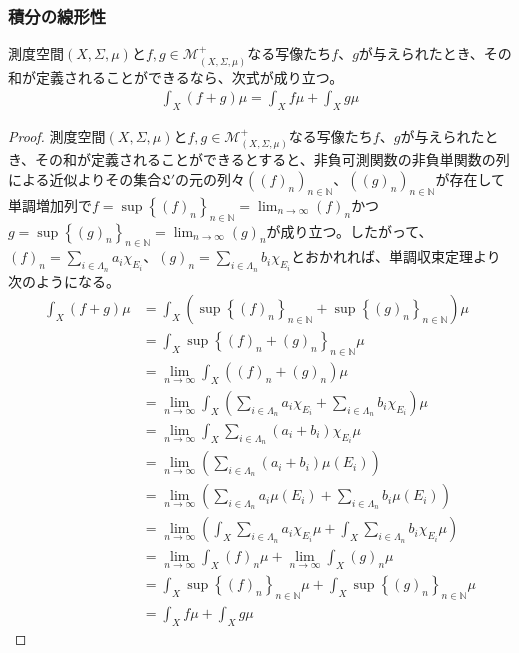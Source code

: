 \documentclass[dvipdfmx]{jsarticle}
\begin{document}
\subsubsection{積分の線形性}%
\begin{thm}\label{4.6.1.29}
測度空間$(X,\varSigma,\mu)$と$f,g \in \mathcal{M}_{(X,\varSigma,\mu)}^{+}$なる写像たち$f$、$g$が与えられたとき、その和が定義されることができるなら、次式が成り立つ。
\begin{align*}
\int_{X} {(f + g)\mu} = \int_{X} {f\mu} + \int_{X} {g\mu}
\end{align*}
\end{thm}
\begin{proof}
測度空間$(X,\varSigma,\mu)$と$f,g \in \mathcal{M}_{(X,\varSigma,\mu)}^{+}$なる写像たち$f$、$g$が与えられたとき、その和が定義されることができるとすると、非負可測関数の非負単関数の列による近似よりその集合$\mathfrak{L}'$の元の列々$\left( (f)_{n} \right)_{n \in \mathbb{N}}$、$\left( (g)_{n} \right)_{n \in \mathbb{N}}$が存在して単調増加列で$f = \sup\left\{ (f)_{n} \right\}_{n \in \mathbb{N}} = \lim_{n \rightarrow \infty}(f)_{n}$かつ$g = \sup\left\{ (g)_{n} \right\}_{n \in \mathbb{N}} = \lim_{n \rightarrow \infty}(g)_{n}$が成り立つ。したがって、$(f)_{n} = \sum_{i \in \varLambda_{n}} {a_{i}\chi_{E_{i}}}$、$(g)_{n} = \sum_{i \in \varLambda_{n}} {b_{i}\chi_{E_{i}}}$とおかれれば、単調収束定理より次のようになる。
\begin{align*}
\int_{X} {(f + g)\mu} &= \int_{X} {\left( \sup\left\{ (f)_{n} \right\}_{n \in \mathbb{N}} + \sup\left\{ (g)_{n} \right\}_{n \in \mathbb{N}} \right)\mu}\\
&= \int_{X} {\sup\left\{ (f)_{n} + (g)_{n} \right\}_{n \in \mathbb{N}}\mu}\\
&= \lim_{n \rightarrow \infty}{\int_{X} {\left( (f)_{n} + (g)_{n} \right)\mu}}\\
&= \lim_{n \rightarrow \infty}{\int_{X} {\left( \sum_{i \in \varLambda_{n}} {a_{i}\chi_{E_{i}}} + \sum_{i \in \varLambda_{n}} {b_{i}\chi_{E_{i}}} \right)\mu}}\\
&= \lim_{n \rightarrow \infty}{\int_{X} {\sum_{i \in \varLambda_{n}} {\left( a_{i} + b_{i} \right)\chi_{E_{i}}}\mu}}\\
&= \lim_{n \rightarrow \infty}\left( \sum_{i \in \varLambda_{n}} {\left( a_{i} + b_{i} \right)\mu\left( E_{i} \right)} \right)\\
&= \lim_{n \rightarrow \infty}\left( \sum_{i \in \varLambda_{n}} {a_{i}\mu\left( E_{i} \right)} + \sum_{i \in \varLambda_{n}} {b_{i}\mu\left( E_{i} \right)} \right)\\
&= \lim_{n \rightarrow \infty}\left( \int_{X} {\sum_{i \in \varLambda_{n}} {a_{i}\chi_{E_{i}}}\mu} + \int_{X} {\sum_{i \in \varLambda_{n}} {b_{i}\chi_{E_{i}}}\mu} \right)\\
&= \lim_{n \rightarrow \infty}{\int_{X} {(f)_{n}\mu}} + \lim_{n \rightarrow \infty}{\int_{X} {(g)_{n}\mu}}\\
&= \int_{X} {\sup\left\{ (f)_{n} \right\}_{n \in \mathbb{N}}\mu} + \int_{X} {\sup\left\{ (g)_{n} \right\}_{n \in \mathbb{N}}\mu}\\
&= \int_{X} {f\mu} + \int_{X} {g\mu}
\end{align*}
\end{proof}
\end{document}
